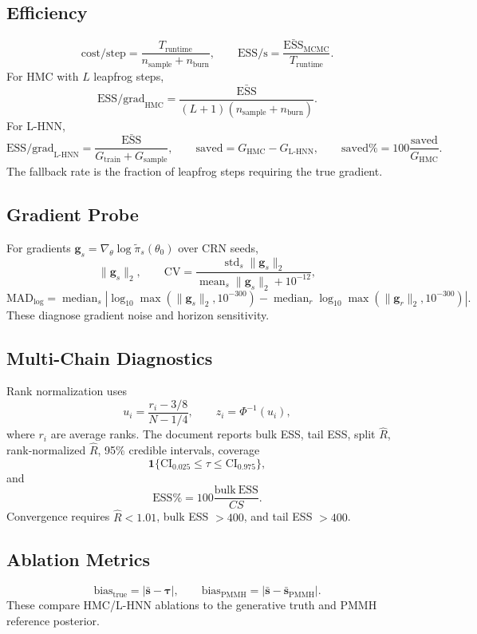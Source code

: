 \documentclass[11pt]{article}
\newcommand{\ESS}{\mathrm{ESS}}
\newcommand{\ind}{\mathbf{1}}
\begin{document}
\subsection*{Efficiency}
\[
\mathrm{cost/step}=\frac{T_{\mathrm{runtime}}}{n_{\mathrm{sample}}+n_{\mathrm{burn}}},
\qquad
\mathrm{ESS/s}=\frac{\bar{\ESS}_{\mathrm{MCMC}}}{T_{\mathrm{runtime}}}.
\]
For HMC with \(L\) leapfrog steps,
\[
\mathrm{ESS/grad}_{\mathrm{HMC}}=
\frac{\bar{\ESS}}{(L+1)(n_{\mathrm{sample}}+n_{\mathrm{burn}})}.
\]
For L-HNN,
\[
\mathrm{ESS/grad}_{\mathrm{L\text{-}HNN}}=
\frac{\bar{\ESS}}{G_{\mathrm{train}}+G_{\mathrm{sample}}},
\qquad
\mathrm{saved}=G_{\mathrm{HMC}}-G_{\mathrm{L\text{-}HNN}},
\qquad
\mathrm{saved\%}=100\frac{\mathrm{saved}}{G_{\mathrm{HMC}}}.
\]
The fallback rate is the fraction of leapfrog steps requiring the true gradient.

\subsection*{Gradient Probe}
For gradients \(\bm g_s=\nabla_\theta\log\tilde\pi_s(\theta_0)\) over CRN seeds,
\[
\|\bm g_s\|_2,\qquad
\mathrm{CV}=\frac{\operatorname{std}_s\|\bm g_s\|_2}{\operatorname{mean}_s\|\bm g_s\|_2+10^{-12}},
\]
\[
\mathrm{MAD}_{\log}=\operatorname{median}_s\left|\log_{10}\max(\|\bm g_s\|_2,10^{-300})-\operatorname{median}_r\log_{10}\max(\|\bm g_r\|_2,10^{-300})\right|.
\]
These diagnose gradient noise and horizon sensitivity.

\subsection*{Multi-Chain Diagnostics}
Rank normalization uses
\[
u_i=\frac{r_i-3/8}{N-1/4},\qquad z_i=\Phi^{-1}(u_i),
\]
where \(r_i\) are average ranks. The document reports bulk ESS, tail ESS, split \(\hat R\), rank-normalized \(\hat R\), 95\% credible intervals, coverage
\[
\ind\{\mathrm{CI}_{0.025}\le\tau\le\mathrm{CI}_{0.975}\},
\]
and
\[
\mathrm{ESS\%}=100\frac{\mathrm{bulk\ ESS}}{CS}.
\]
Convergence requires \(\hat R<1.01\), bulk ESS \(>400\), and tail ESS \(>400\).

\subsection*{Ablation Metrics}
\[
\mathrm{bias}_{\mathrm{true}}=|\bar{\bm s}-\bm\tau|,
\qquad
\mathrm{bias}_{\mathrm{PMMH}}=|\bar{\bm s}-\bar{\bm s}_{\mathrm{PMMH}}|.
\]
These compare HMC/L-HNN ablations to the generative truth and PMMH reference posterior.
\end{document}
